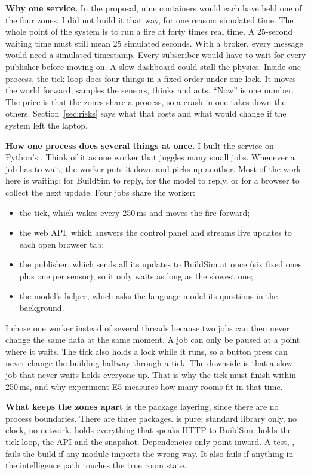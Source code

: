 \textbf{Why one service.} In the proposal, nine containers would each have held one
of the four zones. I did not build it that way, for one reason: simulated time. The
whole point of the system is to run a fire at forty times real time. A 25-second
waiting time must still mean 25 simulated seconds. With a broker, every message
would need a simulated timestamp. Every subscriber would have to wait for every
publisher before moving on. A slow dashboard could stall the physics. Inside one
process, the tick loop does four things in a fixed order under one lock. It moves the
world forward, samples the sensors, thinks and acts. ``Now'' is one number. The
price is that the zones share a process, so a crash in one takes down the others.
Section~\ref{sec:risks} says what that costs and what would change if the system left the laptop.

\textbf{How one process does several things at once.} I built the service on
Python's . Think of it as one worker that juggles many small jobs.
Whenever a job has to wait, the worker puts it down and picks up another. Most of
the work here is waiting: for BuildSim to reply, for the model to reply, or for a
browser to collect the next update. Four jobs share the worker:
\begin{itemize}[nosep]
  \item the tick, which wakes every 250\,ms and moves the fire forward;
  \item the web API, which answers the control panel and streams live updates to
    each open browser tab;
  \item the publisher, which sends all its updates to BuildSim at once (six fixed
    ones plus one per sensor), so it only waits as long as the slowest one;
  \item the model's helper, which asks the language model its questions in the
    background.
\end{itemize}
I chose one worker instead of several threads because two jobs can then never
change the same data at the same moment. A job can only be paused at a point
where it waits. The tick also holds a lock while it runs, so a button press can
never change the building halfway through a tick. The downside is that a slow job
that never waits holds everyone up. That is why the tick must finish within
250\,ms, and why experiment E5 measures how many rooms fit in that time.

\textbf{What keeps the zones apart} is the package layering, since there are no
process boundaries. There are three packages.  is pure: standard library
only, no clock, no network.  holds everything that speaks HTTP to
BuildSim.  holds the tick loop, the API and the snapshot. Dependencies only
point inward. A test, , fails the build if any module imports
the wrong way. It also fails if anything in the intelligence path touches the true
room state.

